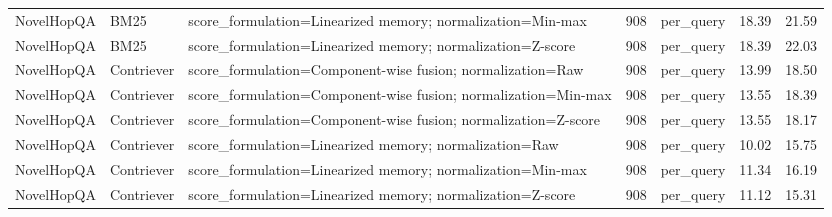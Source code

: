 \begin{tabular}{lllllll}
NovelHopQA & BM25 & score\_formulation=Linearized memory; normalization=Min-max & 908 & per\_query & 18.39 & 21.59 \\
NovelHopQA & BM25 & score\_formulation=Linearized memory; normalization=Z-score & 908 & per\_query & 18.39 & 22.03 \\
NovelHopQA & Contriever & score\_formulation=Component-wise fusion; normalization=Raw & 908 & per\_query & 13.99 & 18.50 \\
NovelHopQA & Contriever & score\_formulation=Component-wise fusion; normalization=Min-max & 908 & per\_query & 13.55 & 18.39 \\
NovelHopQA & Contriever & score\_formulation=Component-wise fusion; normalization=Z-score & 908 & per\_query & 13.55 & 18.17 \\
NovelHopQA & Contriever & score\_formulation=Linearized memory; normalization=Raw & 908 & per\_query & 10.02 & 15.75 \\
NovelHopQA & Contriever & score\_formulation=Linearized memory; normalization=Min-max & 908 & per\_query & 11.34 & 16.19 \\
NovelHopQA & Contriever & score\_formulation=Linearized memory; normalization=Z-score & 908 & per\_query & 11.12 & 15.31 \\
\hline
\end{tabular}
